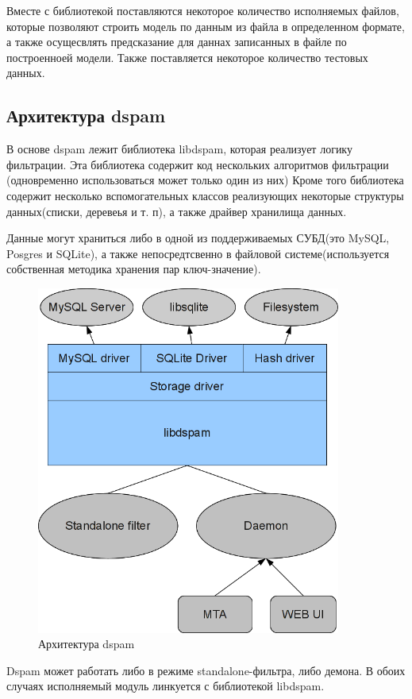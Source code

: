 Вместе с библиотекой поставляются некоторое количество исполняемых файлов, которые позволяют строить модель по данным из файла в определенном формате, а также осущесвлять предсказание для даннах записанных в файле по построенноей модели. Также поставляется некоторое количество тестовых данных.

\subsection{Архитектура dspam}
В основе dspam лежит библиотека libdspam, которая реализует логику фильтрации.
Эта библиотека содержит код нескольких алгоритмов фильтрации (одновременно использоваться может только один из них)
Кроме того библиотека содержит несколько вспомогательных классов реализующих некоторые структуры данных(списки, деревеья и т. п), а также драйвер хранилища данных.

Данные могут храниться либо в одной из поддерживаемых СУБД(это MySQL, Posgres и SQLite), а также непосредтсвенно в файловой системе(используется собственная методика хранения пар ключ-значение).

\begin{figure}[h]
\begin{center}
\includegraphics[width=10cm]{img/dspamarch}
\end{center}
\caption{Архитектура dspam}
\label{dspamarch}
\end{figure}

Dspam может работать либо в режиме standalone-фильтра, либо демона. В обоих случаях
исполняемый модуль линкуется с библиотекой libdspam.

